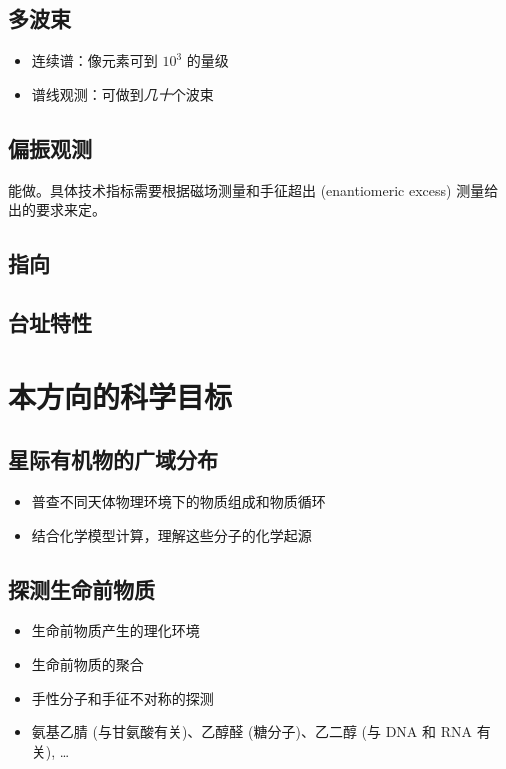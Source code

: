 \documentclass{article}
\begin{document}
\subsection{多波束}
\begin{itemize}
  \item 连续谱：像元素可到 $10^3$ 的量级
  \item 谱线观测：可做到\emph{几十}个波束
\end{itemize}

\subsection{偏振观测}
能做。具体技术指标需要根据磁场测量和手征超出 (enantiomeric excess) 测量给出的要求来定。

\subsection{指向}

\subsection{台址特性}

\section{本方向的科学目标}

\subsection{星际有机物的广域分布}
  \begin{itemize}
    \item 普查不同天体物理环境下的物质组成和物质循环
    \item 结合化学模型计算，理解这些分子的化学起源
  \end{itemize}
\subsection{探测生命前物质}
  \begin{itemize}
    \item 生命前物质产生的理化环境
    \item 生命前物质的聚合
    \item 手性分子和手征不对称的探测
    \item 氨基乙腈 (与甘氨酸有关)、乙醇醛 (糖分子)、乙二醇 (与 DNA 和 RNA 有关), \ldots
  \end{itemize}
\end{document}
